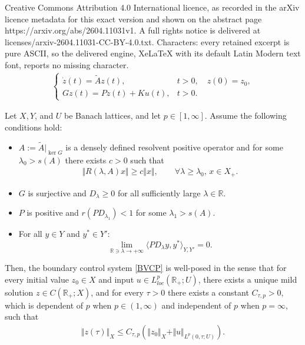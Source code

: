 \documentclass[10pt,a4paper]{amsart}
\def\R{{\mathbb{R}}}
\begin{document}
Creative Commons Attribution 4.0 International licence, as recorded in the arXiv licence metadata for this exact version and shown on the abstract page https://arxiv.org/abs/2604.11031v1. A full rights notice is delivered at licenses/arxiv-2604.11031-CC-BY-4.0.txt. Characters: every retained excerpt is pure ASCII, so the delivered engine, XeLaTeX with its default Latin Modern text font, reports no missing character.
    	\begin{align}\label{BVCP}
		\begin{cases}
			\dot{z}(t) = \tilde{A} z(t), & t > 0, \quad z(0)=z_0, \\
			G z(t) = P z(t) + K u(t), & t > 0.
		\end{cases}
	\end{align}

	\begin{theorem}\label{Main1}
		Let $X,Y$, and $U$ be Banach lattices, and let $p \in [1,\infty]$.
		Assume the following conditions hold:
		\begin{itemize}
			\item[\bf{(A1)}] $A := \tilde{A}\vert_{\ker G}$ is a densely defined resolvent positive operator and for some $\lambda_0 > s(A)$ there exists $c > 0$ such that
			\begin{align}\label{inverse2}
				\Vert R(\lambda, A)x \Vert \geq c \Vert x \Vert, \qquad \forall \lambda \ge \lambda_0, \, x \in {X_+}.
			\end{align}
			\item[\bf{(A2)}] $G$ is surjective and $D_{\lambda} \ge 0$  {for all sufficiently large $\lambda\in \R$}.
			\item[\bf{(A3)}] $P$ is positive and $r(P D_{\lambda_1}) < 1$ for some $\lambda_1 > s(A)$.
			\item[\bf{(A4)}] For all $y \in Y$ and $y^* \in Y'$:
			$$\lim_{\R \ni \lambda \to +\infty} \langle P D_\lambda y, y^* \rangle_{Y,Y'} = 0.$$
		\end{itemize}
		Then, the  boundary control system \eqref{BVCP} is well-posed in the sense that for every initial value $z_0 \in X$ and input $u \in L^p_{loc}(\R_+;U)$, there exists a unique mild solution $z \in {C}(\R_+; X)$, and for every $\tau > 0$ there exists a constant $C_{\tau,p} > 0$, which is dependent of $p$ when $p\in(1,\infty)$ and  independent of $p$ when $p=\infty$, such that
		\begin{align*}
			\Vert z(\tau) \Vert_X  \le C_{\tau,p} \left( \Vert z_0 \Vert_X  + \Vert u \Vert_{L^p(0,\tau;U)}   \right).
		\end{align*}
	\end{theorem}
\end{document}
